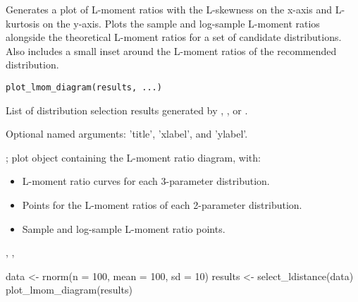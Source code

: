\documentclass[a4paper]{book}
\begin{document}
%
\begin{Description}
Generates a plot of L-moment ratios with the L-skewness on the x-axis and L-kurtosis
on the y-axis. Plots the sample and log-sample L-moment ratios alongside the
theoretical L-moment ratios for a set of candidate distributions. Also includes
a small inset around the L-moment ratios of the recommended distribution.
\end{Description}
%
\begin{Usage}
\begin{verbatim}
plot_lmom_diagram(results, ...)
\end{verbatim}
\end{Usage}
%
\begin{Arguments}
\begin{ldescription}
\item[\code{results}] List of distribution selection results generated by ,
, or .

\item[\code{...}] Optional named arguments: 'title', 'xlabel', and 'ylabel'.
\end{ldescription}
\end{Arguments}
%
\begin{Value}
; plot object containing the L-moment ratio diagram, with:
\begin{itemize}

\item{} L-moment ratio curves for each 3-parameter distribution.
\item{} Points for the L-moment ratios of each 2-parameter distribution.
\item{} Sample and log-sample L-moment ratio  points.

\end{itemize}

\end{Value}
%
\begin{SeeAlso}
, , 
\end{SeeAlso}
%
\begin{Examples}
\begin{ExampleCode}
data <- rnorm(n = 100, mean = 100, sd = 10)
results <- select_ldistance(data)
plot_lmom_diagram(results)

\end{ExampleCode}
\end{Examples}
\end{document}
